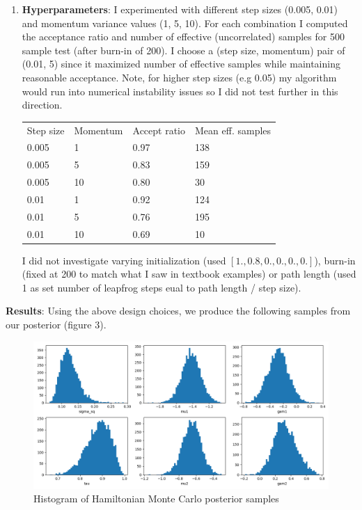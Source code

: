 \documentclass[12pt,letterpaper,twoside]{article}
\begin{document}
\begin{enumerate}[label=(\alph*)]
\item \textbf{Hyperparameters}: I experimented with different step 
sizes (0.005, 0.01) and momentum variance values (1, 5, 10). 
For each combination I computed the acceptance ratio and number of 
effective (uncorrelated) samples for 500 sample test (after 
burn-in of 200). I choose a (step size, momentum) pair of 
(0.01, 5) since it maximized number of effective samples while 
maintaining reasonable acceptance. Note, for higher step sizes 
(e.g 0.05) my algorithm would run into numerical instability issues 
so I did not test further in this direction.

\begin{table}[H]
    \centering
    \begin{tabular}{llll}
        Step size    & Momentum     & Accept ratio      & Mean eff. samples     \\
        0.005        & 1            & 0.97              & 138                   \\ 
        0.005        & 5            & 0.83              & 159                   \\
        0.005        & 10           & 0.80              & 30                    \\
        0.01         & 1            & 0.92              & 124                   \\
        0.01         & 5            & 0.76              & 195                   \\
        0.01         & 10           & 0.69              & 10                    \\    
    \end{tabular}
\end{table}

I did not investigate varying initialization (used $[1., 0.8, 0., 0., 0., 0.]$), 
burn-in (fixed at 200 to match what I saw in textbook examples) or path length
(used 1 as set number of leapfrog steps eual to path length / step size).
\end{enumerate}

\textbf{Results}: Using the above design choices, we produce the following 
samples from our posterior (figure 3).
\begin{figure}[H]
    \centering
    \includegraphics[scale=0.55]{hmc_sampled_histogram.png}
    \vspace*{-10mm}
    \caption{Histogram of Hamiltonian Monte Carlo posterior samples}
\end{figure}
\end{document}
